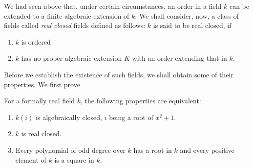 We had seen above that, under certain circumstances, an order in a
field $k$ can be extended to a finite algebraic extension of $k$. We
shall consider, now, a class of fields called \textit{real closed}
fields defined as follows: $k$ is said to be real closed, if 
\begin{enumerate}[1)]
\item $k$ is ordered

\item $k$ has no proper algebraic extension $K$ with an order
  extending that in $k$.
\end{enumerate}

Before we establish the existence of such fields, we shall obtain some
of their properties. We first prove

\begin{thm}\label{c7:thm4}%
For a formally real field $k$, the following  properties are
equivalent:
\begin{enumerate}[1)]
\item $k(i)$ is algebraically closed, $i$ being a root of $x^2+1$.

\item $k$ is real closed.

\item Every polynomial of odd degree over $k$ has a root in $k$ and
  every positive element of $k$ is a square in $k$.
\end{enumerate}
\end{thm}

